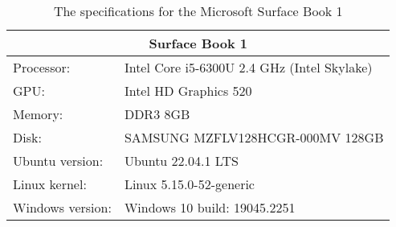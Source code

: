 \begin{table}[H]
    \begin{tabular}{ll}
    \hline
    \multicolumn{2}{|c|}{Surface Book 1}           \\ \hline
    Processor:      & Intel Core i5-6300U 2.4 GHz (Intel Skylake)      \\
    GPU:            & Intel HD Graphics 520          \\
    Memory:         & DDR3 8GB                         \\
    Disk:           & SAMSUNG MZFLV128HCGR-000MV 128GB \\
    Ubuntu version:  & Ubuntu 22.04.1 LTS                \\
    Linux kernel: & Linux 5.15.0-52-generic       \\
    Windows version:& Windows 10 build: 19045.2251
    \end{tabular}
    \caption{The specifications for the Microsoft Surface Book 1}
    \label{tab:surfaceBook}
\end{table} 